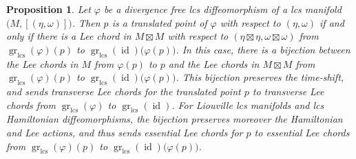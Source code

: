 \documentclass{amsart}
\DeclareMathOperator{\gr}{gr}
\DeclareMathOperator{\lcs}{lcs}
\DeclareMathOperator{\id}{id}
\newtheorem{prop}[thm]{Proposition}
\theoremstyle{remark}
\begin{document}
\begin{prop}\label{proposition: bijection translated points Lee chords graph}
Let $\varphi$ be a divergence free lcs diffeomorphism
of a lcs manifold $\big( M , [(\eta, \omega)] \big)$.
Then $p$ is a translated point
of $\varphi$ with respect to $(\eta, \omega)$
if and only if there is a Lee chord in $M \boxtimes M$
with respect to $(\eta \boxtimes \eta, \omega \boxtimes \omega)$
from $\gr_{\lcs} (\varphi) (p)$
to $\gr_{\lcs} (\id) \big(\varphi(p)\big)$.
In this case,
there is a bijection between
the Lee chords in $M$ from $\varphi (p)$ to $p$
and the Lee chords in $M \boxtimes M$
from $\gr_{\lcs} (\varphi) (p)$
to $\gr_{\lcs} (\id) \big(\varphi(p)\big)$.
This bijection preserves the time-shift,
and sends transverse Lee chords for the translated point $p$
to transverse Lee chords from $\gr_{\lcs} (\varphi)$
to $\gr_{\lcs} (\id)$.
For Liouville lcs manifolds
and lcs Hamiltonian diffeomorphisms,
the bijection preserves moreover
the Hamiltonian and Lee actions,
and thus sends essential Lee chords for $p$
to essential Lee chords from $\gr_{\lcs} (\varphi) (p)$
to $\gr_{\lcs} (\id) \big(\varphi(p)\big)$.
\end{prop}
\end{document}
